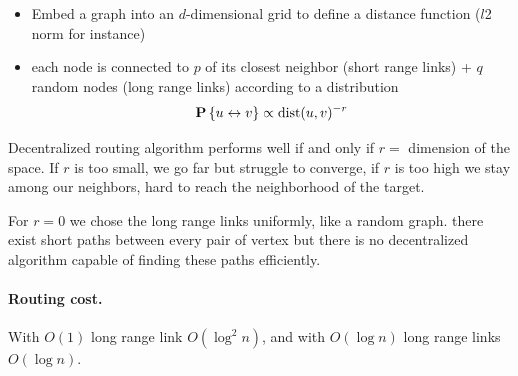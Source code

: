 \begin{itemize}
  \item Embed a graph into an $d$-dimensional grid to define a distance function ($l$2 norm for instance)
  \item each node is connected to $p$ of its closest neighbor (short range links) + $q$ random nodes (long range links) according to a distribution
  \[
    \P{u \leftrightarrow v} \propto \text{dist}(u,v)^{-r}
  \]
\end{itemize}

Decentralized routing algorithm performs well if and only if $r=$ dimension of the space. If $r$ is too small, we go far but struggle to converge, if $r$ is too high we stay among our neighbors, hard to reach the neighborhood of the target.

For $r=0$ we chose the long range links uniformly, like a random graph. there exist short paths between every pair of vertex but there is no decentralized algorithm capable of finding these paths efficiently.

\paragraph{Routing cost.} With $O(1)$ long range link $O(\log^2 n)$, and with $O(\log n)$ long range links $O(\log n)$.
